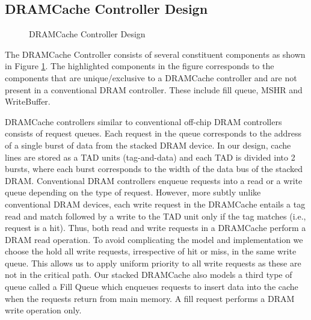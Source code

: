 \subsection{DRAMCache Controller Design}
\begin{figure}[!htb]
	\centering
	\def\svgwidth{\columnwidth}
	
	\caption{DRAMCache Controller Design}
	\label{fig:dramcache-ctrl}
\end{figure}
The DRAMCache Controller consists of several constituent components as shown in Figure \ref{fig:dramcache-ctrl}. The highlighted components in the figure corresponds to the components that are unique/exclusive to a DRAMCache controller and are not present in a conventional DRAM controller. These include fill queue, MSHR and WriteBuffer.
\par DRAMCache controllers similar to conventional off-chip DRAM controllers consists of request queues. Each request in the queue corresponds to the address of a single burst of data from the stacked DRAM device.
In our design, cache lines are stored as a TAD units (tag-and-data) \cite{alloy} and each TAD is divided into 2 bursts, where each burst corresponds to the width of the data bus of the stacked DRAM.
Conventional DRAM controllers enqueue requests into a read or a write queue depending on the type of request. 
However, more subtly unlike conventional DRAM devices, each write request in the DRAMCache entails a tag read and match followed by a write to the TAD unit only if the tag matches (i.e., request is a hit). Thus, both read and write requests in a DRAMCache perform a DRAM read operation. To avoid complicating the model and implementation we choose the hold all write requests, irrespective of hit or miss, in the same write queue. This allows us to apply uniform priority to all write requests as these are not in the critical path.
Our stacked DRAMCache also models a third type of queue called a Fill Queue \cite{dca} which enqueues requests to insert data into the cache when the requests return from main memory. A fill request performs a DRAM write operation only. 

